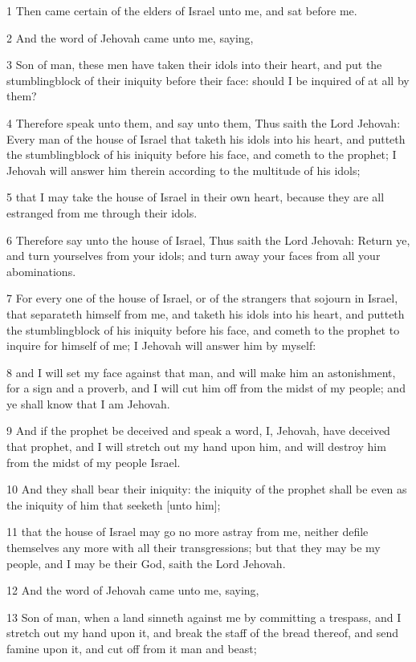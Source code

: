 \par 1 Then came certain of the elders of Israel unto me, and sat before me.
\par 2 And the word of Jehovah came unto me, saying,
\par 3 Son of man, these men have taken their idols into their heart, and put the stumblingblock of their iniquity before their face: should I be inquired of at all by them?
\par 4 Therefore speak unto them, and say unto them, Thus saith the Lord Jehovah: Every man of the house of Israel that taketh his idols into his heart, and putteth the stumblingblock of his iniquity before his face, and cometh to the prophet; I Jehovah will answer him therein according to the multitude of his idols;
\par 5 that I may take the house of Israel in their own heart, because they are all estranged from me through their idols.
\par 6 Therefore say unto the house of Israel, Thus saith the Lord Jehovah: Return ye, and turn yourselves from your idols; and turn away your faces from all your abominations.
\par 7 For every one of the house of Israel, or of the strangers that sojourn in Israel, that separateth himself from me, and taketh his idols into his heart, and putteth the stumblingblock of his iniquity before his face, and cometh to the prophet to inquire for himself of me; I Jehovah will answer him by myself:
\par 8 and I will set my face against that man, and will make him an astonishment, for a sign and a proverb, and I will cut him off from the midst of my people; and ye shall know that I am Jehovah.
\par 9 And if the prophet be deceived and speak a word, I, Jehovah, have deceived that prophet, and I will stretch out my hand upon him, and will destroy him from the midst of my people Israel.
\par 10 And they shall bear their iniquity: the iniquity of the prophet shall be even as the iniquity of him that seeketh [unto him];
\par 11 that the house of Israel may go no more astray from me, neither defile themselves any more with all their transgressions; but that they may be my people, and I may be their God, saith the Lord Jehovah.
\par 12 And the word of Jehovah came unto me, saying,
\par 13 Son of man, when a land sinneth against me by committing a trespass, and I stretch out my hand upon it, and break the staff of the bread thereof, and send famine upon it, and cut off from it man and beast;
